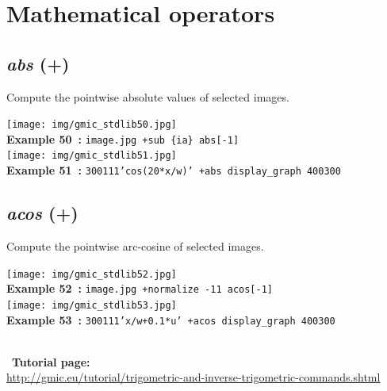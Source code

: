 \documentclass[a4paper,10.5pt,twoside]{book}
\def\comma{\discretionary{,}{}{,}}
\begin{document}
\section{Mathematical operators}


\subsection{\emph{abs} (+)}\vspace*{-0.7em}
Compute the pointwise absolute values of selected images.
\begin{center}\texttt{[image: img/gmic\_stdlib50.jpg]}\\
{\footnotesize \textbf{Example 50~:} \texttt{image.jpg +sub \{ia\} abs[-1]}}
\\\texttt{[image: img/gmic\_stdlib51.jpg]}\\
{\footnotesize \textbf{Example 51~:} \texttt{300{\comma}1{\comma}1{\comma}1{\comma}'cos(20*x/w)' +abs display\_graph 400{\comma}300}}
\end{center}

\subsection{\emph{acos} (+)}\vspace*{-0.7em}
Compute the pointwise arc-cosine of selected images.
\begin{center}\texttt{[image: img/gmic\_stdlib52.jpg]}\\
{\footnotesize \textbf{Example 52~:} \texttt{image.jpg +normalize -1{\comma}1 acos[-1]}}
\\\texttt{[image: img/gmic\_stdlib53.jpg]}\\
{\footnotesize \textbf{Example 53~:} \texttt{300{\comma}1{\comma}1{\comma}1{\comma}'x/w+0.1*u' +acos display\_graph 400{\comma}300}}
\end{center}
~\\
~\textbf{Tutorial page: }\\\url{http://gmic.eu/tutorial/trigometric-and-inverse-trigometric-commands.shtml}
\end{document}
